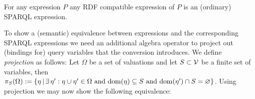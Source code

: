 \begin{enumerate}
%
\end{enumerate}


\begin{proposition} \label{Proposition:EquivalenceOfSyntaxAfterConverting}
	For any {\SPARQLplus} expression $P$ any RDF compatible expression of $P$ is an (ordinary) SPARQL expression.
\end{proposition}

\noindent
To show a (semantic) equivalence between {\SPARQLplus} expressions and the corresponding SPARQL expressions we need an additional algebra operator to project out (bindings for) query variables that the conversion introduces. We define \emph{projection} as follows: Let $\Omega$ be a set of valuations and let $S \subset \mathcal{V}$ be a finite set of variables, then $\pi_S ( \Omega ) := \lbrace \eta \,|\, \exists \, \eta' : \eta \cup \eta' \in \Omega \text{ and } \mathrm{dom}(\eta) \subseteq S \text{ and } \mathrm{dom}(\eta') \cap S = \varnothing \rbrace$.
Using projection we may now show the following equivalence:

